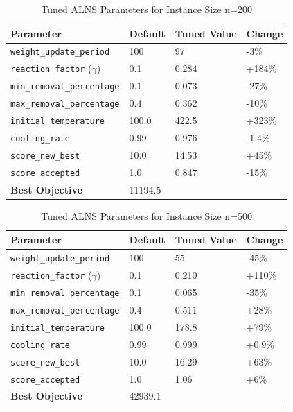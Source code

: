 \documentclass[a4paper]{scrartcl}
\begin{document}
\begin{table}[H]
\centering
\caption{Tuned ALNS Parameters for Instance Size n=200}
\label{tab:tuned_params_n200}
\begin{tabular}{l l l l}
\toprule
Parameter & Default & Tuned Value & Change \\
\midrule
\texttt{weight\_update\_period} & 100 & 97 & -3\% \\
\texttt{reaction\_factor} ($\gamma$) & 0.1 & 0.284 & +184\% \\
\texttt{min\_removal\_percentage} & 0.1 & 0.073 & -27\% \\
\texttt{max\_removal\_percentage} & 0.4 & 0.362 & -10\% \\
\texttt{initial\_temperature} & 100.0 & 422.5 & +323\% \\
\texttt{cooling\_rate} & 0.99 & 0.976 & -1.4\% \\
\texttt{score\_new\_best} & 10.0 & 14.53 & +45\% \\
\texttt{score\_accepted} & 1.0 & 0.847 & -15\% \\
\midrule
\textbf{Best Objective} & \multicolumn{3}{l}{11194.5} \\
\bottomrule
\end{tabular}
\end{table}

\begin{table}[H]
\centering
\caption{Tuned ALNS Parameters for Instance Size n=500}
\label{tab:tuned_params_n500}
\begin{tabular}{l l l l}
\toprule
Parameter & Default & Tuned Value & Change \\
\midrule
\texttt{weight\_update\_period} & 100 & 55 & -45\% \\
\texttt{reaction\_factor} ($\gamma$) & 0.1 & 0.210 & +110\% \\
\texttt{min\_removal\_percentage} & 0.1 & 0.065 & -35\% \\
\texttt{max\_removal\_percentage} & 0.4 & 0.511 & +28\% \\
\texttt{initial\_temperature} & 100.0 & 178.8 & +79\% \\
\texttt{cooling\_rate} & 0.99 & 0.999 & +0.9\% \\
\texttt{score\_new\_best} & 10.0 & 16.29 & +63\% \\
\texttt{score\_accepted} & 1.0 & 1.06 & +6\% \\
\midrule
\textbf{Best Objective} & \multicolumn{3}{l}{42939.1} \\
\bottomrule
\end{tabular}
\end{table}
\end{document}
